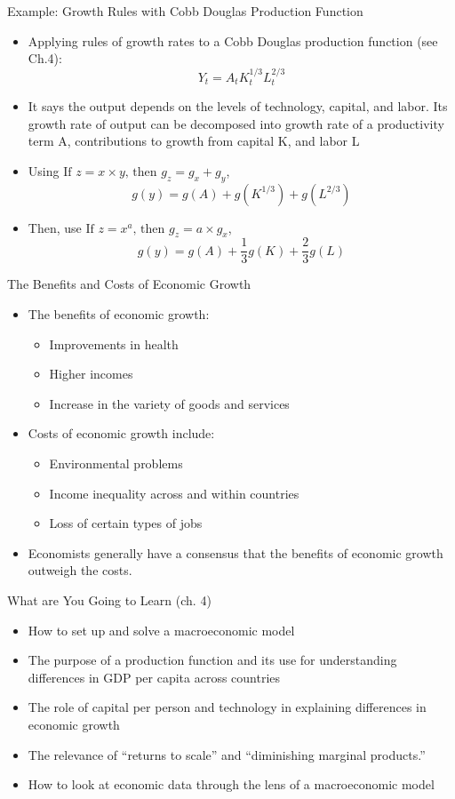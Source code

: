\documentclass[aspectratio=1610]{beamer}
\begin{document}
\begin{frame}[wide]{Example: Growth Rules with Cobb Douglas Production Function}
	\begin{itemize}
		\item Applying rules of growth rates to a Cobb Douglas production function (see Ch.4):
		\[Y_t = A_t K_t^{1/3} L_t^{2/3}\]
		\item It says the output depends on the levels of technology, capital, and labor. Its growth rate of output can be decomposed into growth rate of a productivity term A,	contributions to growth from capital K, and labor L
		\item Using $\text{If } z=x\times y \text{, then  } g_z=g_x+g_y$,
		\[g(y) = g(A) + g(K^{1/3}) + g(L^{2/3})\]
		\item Then, use $\text{If } z=x^a \text{, then  } g_z=a \times g_x$, 
		\[g(y) = g(A) + \frac{1}{3}g(K) + \frac{2}{3} g(L)\]
	\end{itemize}
\end{frame}

\begin{frame}[wide]{The Benefits and Costs of Economic Growth}
	\begin{itemize}
		\item The benefits of economic growth:
		\begin{itemize}
			\item Improvements in health
			\item Higher incomes
			\item Increase in the variety of goods and services
		\end{itemize}
		\item Costs of economic growth include:
		\begin{itemize}
			\item Environmental problems
			\item Income inequality across and within countries
			\item Loss of certain types of jobs
		\end{itemize}
		\item	Economists generally have a consensus that the benefits of economic growth outweigh the costs.
	\end{itemize}
\end{frame}

\begin{frame}[wide]{What are You Going to Learn (ch. 4)}
	\begin{itemize}
		\item How to set up and solve a macroeconomic model
		\item The purpose of a production function and its use for understanding differences in GDP per capita across countries
		\item The role of capital per person and technology in explaining differences in economic growth
		\item The relevance of “returns to scale” and “diminishing marginal products.”
		\item How to look at economic data through the lens of a macroeconomic model
	\end{itemize}
\end{frame}
\end{document}
